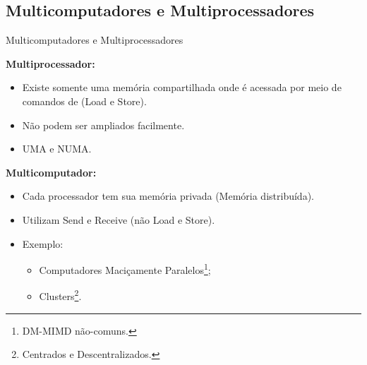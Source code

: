%
%		
%		
%		
%





\subsection{Multicomputadores e Multiprocessadores}
\begin{frame}{Multicomputadores e Multiprocessadores}
	\begin{multicols}{2}
	
		{\bf Multiprocessador:}
		\begin{itemize}
			\item Existe somente uma memória compartilhada onde é acessada por meio de comandos de (Load e Store).
			\item Não podem ser ampliados facilmente.
			\item UMA e NUMA.
		\end{itemize}
	\columnbreak
		{\bf Multicomputador:}
		\begin{itemize}
			\item Cada processador tem sua memória privada (Memória distribuída).
			\item Utilizam Send e Receive (não Load e Store).
			\item Exemplo:
			\begin{itemize}
				\item Computadores Maciçamente Paralelos\footnote{DM-MIMD não-comuns.};
				\item Clusters\footnote{Centrados e Descentralizados.}.
			\end{itemize}
		\end{itemize}
	            
	\end{multicols}
\end{frame}